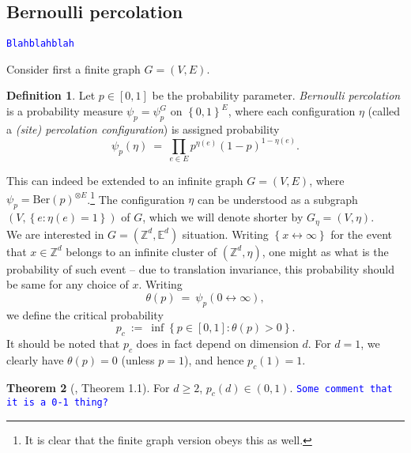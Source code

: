 \documentclass[12pt]{article}
\newcommand{\Z}{\mathbb{Z}}
\newcommand{\set}[1]{\left\{#1\right\}}
\newcommand{\1}{\mathbbm{1}}
\newcommand{\5}{\vspace{0.5cm}}
\theoremstyle{definition}
\newtheorem{thm}{Theorem}[section]
\newtheorem{df}[thm]{Definition}
\begin{document}

\subsection{Bernoulli percolation}\label{app:3}

\textcolor{blue}{\texttt{Blahblahblah}} %

Consider first a finite graph $G=(V,E)$.
\begin{df}
Let $p\in[0,1]$ be the probability parameter. \textit{Bernoulli percolation} is a probability measure $\psi_p=\psi_p^G$ on $\set{0,1}^E$, where each configuration $\eta$ (called a \textit{(site) percolation configuration}) is assigned probability
$$\psi_p(\eta) ~=~ \prod_{e\in E}p^{\eta(e)}(1-p)^{1-\eta(e)}.$$
\end{df}
This can indeed be extended to an infinite graph $G=(V,E)$, where $\psi_p=\mathrm{Ber}(p)^{\otimes E}$.\footnote{It is clear that the finite graph version obeys this as well.} The configuration $\eta$ can be understood as a subgraph $(V,\set{e:\eta(e)=1})$ of $G$, which we will denote shorter by $G_\eta=(V,\eta)$.\\

We are interested in $G=(\Z^d,\mathbb{E}^d)$ situation. Writing $\set{x\leftrightarrow\infty}$ for the event that $x\in\Z^d$ belongs to an infinite cluster of $(\Z^d,\eta)$, one might as  what is the probability of such event -- due to translation invariance, this probability should be same for any choice of $x$. Writing
$$\theta(p) ~=~ \psi_p(0\leftrightarrow\infty),$$
we define the critical probability
$$p_c ~:=~ \inf\set{p\in[0,1]:\theta(p)>0}.$$
It should be noted that $p_c$ does in fact depend on dimension $d$. For $d=1$, we clearly have $\theta(p)=0$ (unless $p=1$), and hence $p_c(1)=1$. 

\begin{thm}[\cite{D-C}, Theorem 1.1]
For $d\geq 2$, $p_c(d)\in (0,1)$. \textcolor{blue}{\texttt{Some comment that it is a 0-1 thing?}}
\end{thm} 


\pagebreak

\end{document}
